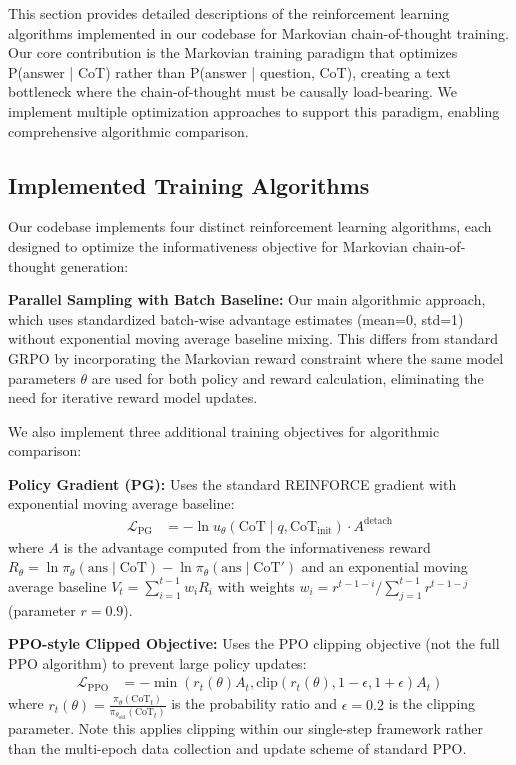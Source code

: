 \documentclass{article}
\begin{document}
This section provides detailed descriptions of the reinforcement learning algorithms implemented in our codebase for Markovian chain-of-thought training. Our core contribution is the Markovian training paradigm that optimizes P(answer | CoT) rather than P(answer | question, CoT), creating a text bottleneck where the chain-of-thought must be causally load-bearing. We implement multiple optimization approaches to support this paradigm, enabling comprehensive algorithmic comparison.

\subsection{Implemented Training Algorithms}

Our codebase implements four distinct reinforcement learning algorithms, each designed to optimize the informativeness objective for Markovian chain-of-thought generation:

\textbf{Parallel Sampling with Batch Baseline:} Our main algorithmic approach, which uses standardized batch-wise advantage estimates (mean=0, std=1) without exponential moving average baseline mixing. This differs from standard GRPO by incorporating the Markovian reward constraint where the same model parameters $\theta$ are used for both policy and reward calculation, eliminating the need for iterative reward model updates.

We also implement three additional training objectives for algorithmic comparison:

\textbf{Policy Gradient (PG):} Uses the standard REINFORCE gradient with exponential moving average baseline:
\begin{align}
\mathcal{L}_{\text{PG}} &= -\ln u_\theta(\text{CoT} \mid q, \text{CoT}_{\text{init}}) \cdot A^{\text{detach}}
\end{align}
where $A$ is the advantage computed from the informativeness reward $R_\theta = \ln \pi_\theta(\text{ans} \mid \text{CoT}) - \ln \pi_\theta(\text{ans} \mid \text{CoT}')$ and an exponential moving average baseline $V_t = \sum_{i=1}^{t-1} w_i R_i$ with weights $w_i = r^{t-1-i} / \sum_{j=1}^{t-1} r^{t-1-j}$ (parameter $r = 0.9$).

\textbf{PPO-style Clipped Objective:} Uses the PPO clipping objective (not the full PPO algorithm) to prevent large policy updates:
\begin{align}
\mathcal{L}_{\text{PPO}} &= -\min(r_t(\theta) A_t, \text{clip}(r_t(\theta), 1-\epsilon, 1+\epsilon) A_t)
\end{align}
where $r_t(\theta) = \frac{\pi_\theta(\text{CoT}_t)}{\pi_{\theta_{\text{old}}}(\text{CoT}_t)}$ is the probability ratio and $\epsilon = 0.2$ is the clipping parameter. Note this applies clipping within our single-step framework rather than the multi-epoch data collection and update scheme of standard PPO.
\end{document}
